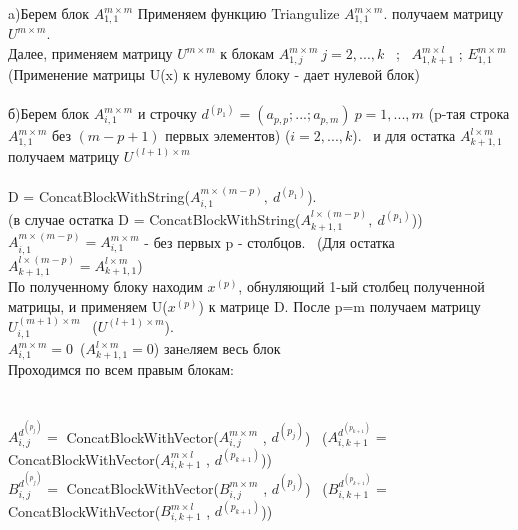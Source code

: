 \documentclass[a4paper,12pt]{article}
\begin{document}
\hspace{0.25cm} a)Берем блок $A_{1,1}^{m\times m}$ Применяем функцию Triangulize $A_{1,1}^{m\times m} $. получаем матрицу $U^{m\times m}$. \\
Далее, применяем матрицу $U^{m\times m}$ к блокам $A_{1,j}^{m\times m} \ j = 2,...,k$ \ ; \ $A_{1,k+1}^{m\times l} $ ; $E_{1,1}^{m\times m}$ (Применение матрицы U(x) к нулевому блоку - дает нулевой блок)\\\\


\hspace{0.25cm} б)Берем блок $A_{i,1}^{{m\times m}}$ и строчку $d^{(p_{1})} = (a_{p,p};...;a_{p,m}) \ p = 1,...,m$  (p-тая строка $A_{1,1}^{m\times m} $ без $(m-p+1)$ первых элементов) ($i = 2,..., k$). \ и для остатка $A_{k+1,1}^{{l\times m}}$ получаем матрицу $U^{(l+1)\times m}$\\\\
D = ConcatBlockWithString($A_{i,1}^{{m\times (m-p)}}, \ d^{(p_{1})}$).\\ 
(в случае остатка D = ConcatBlockWithString($A_{k+1,1}^{{l\times (m-p)}}, \ d^{(p_{1})}$))\\
$A_{i,1}^{m\times (m-p)} = A_{i,1}^{m\times m}$ - без первых p - столбцов. \ (Для остатка $A_{k+1,1}^{l\times (m-p)} = A_{k+1,1}^{l\times m}$)\\
 По полученному блоку находим $x^{(p)}$, обнуляющий 1-ый столбец полученной матрицы, и применяем U($x^{(p)}$) к матрице D. После p=m получаем матрицу $U_{i,1}^{(m+1)\times m}$ \ ($U^{(l+1)\times m}$).\\
$A_{i,1}^{{m\times m}} = 0$\  ($A_{k+1,1}^{{l\times m}} = 0$) занeляем весь блок \\
Проходимся по всем правым блокам:\\
\\\\$A_{i,j}^{d^{(p_{j})}} =$  ConcatBlockWithVector($A_{i,j}^{m\times m}$ , $d^{(p_{j})}$) \ ($A_{i,k+1}^{d^{(p_{k+1})}} = $   ConcatBlockWithVector($A_{i,k+1}^{m\times l}$ , $d^{(p_{k+1})}$)) \\

$B_{i,j}^{d^{(p_{j})}} = $ ConcatBlockWithVector($B_{i,j}^{m\times m}$ , $d^{(p_{j})}$) \ 
($B_{i,k+1}^{d^{(p_{k+1})}} = $   ConcatBlockWithVector($B_{i,k+1}^{m\times l}$ , $d^{(p_{k+1})}$))\\
\end{document}
